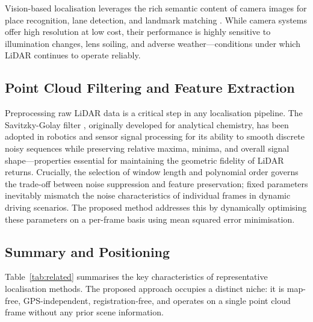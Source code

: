 \documentclass[lettersize,journal]{IEEEtran}
\begin{document}
Vision-based localisation leverages the rich semantic content of camera images for
place recognition, lane detection, and landmark matching \cite{sun2006on}. While
camera systems offer high resolution at low cost, their performance is highly sensitive
to illumination changes, lens soiling, and adverse weather---conditions under which
LiDAR continues to operate reliably.

\subsection{Point Cloud Filtering and Feature Extraction}

Preprocessing raw LiDAR data is a critical step in any localisation pipeline.
The Savitzky-Golay filter \cite{savitzky1964smoothing}, originally developed for
analytical chemistry, has been adopted in robotics and sensor signal processing for
its ability to smooth discrete noisy sequences while preserving relative maxima,
minima, and overall signal shape---properties essential for maintaining the geometric
fidelity of LiDAR returns. Crucially, the selection of window length and polynomial
order governs the trade-off between noise suppression and feature preservation; fixed
parameters inevitably mismatch the noise characteristics of individual frames in
dynamic driving scenarios. The proposed method addresses this by dynamically
optimising these parameters on a per-frame basis using mean squared error minimisation.

\subsection{Summary and Positioning}

Table~\ref{tab:related} summarises the key characteristics of representative
localisation methods. The proposed approach occupies a distinct niche: it is
map-free, GPS-independent, registration-free, and operates on a single point cloud
frame without any prior scene information.
\end{document}
